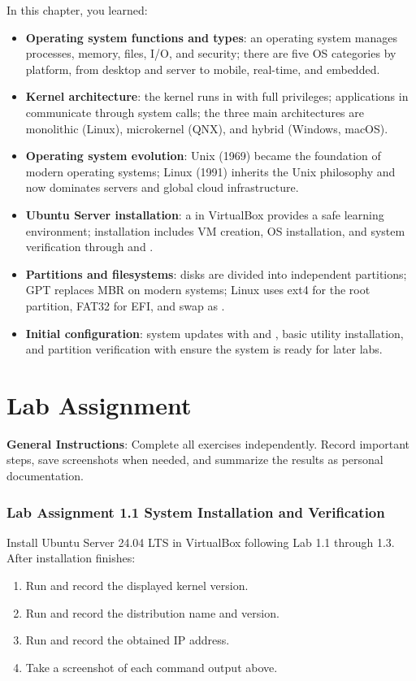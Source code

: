 In this chapter, you learned:

\begin{itemize}[noitemsep,topsep=2pt]
    \item \textbf{Operating system functions and types}: an operating system manages processes, memory, files, I/O, and security; there are five OS categories by platform, from desktop and server to mobile, real-time, and embedded.
    \item \textbf{Kernel architecture}: the kernel runs in  with full privileges; applications in  communicate through system calls; the three main architectures are monolithic (Linux), microkernel (QNX), and hybrid (Windows, macOS).
    \item \textbf{Operating system evolution}: Unix (1969) became the foundation of modern operating systems; Linux (1991) inherits the Unix philosophy and now dominates servers and global cloud infrastructure.
    \item \textbf{Ubuntu Server installation}: a  in VirtualBox provides a safe learning environment; installation includes VM creation, OS installation, and system verification through  and .
    \item \textbf{Partitions and filesystems}: disks are divided into independent partitions; GPT replaces MBR on modern systems; Linux uses ext4 for the root partition, FAT32 for EFI, and swap as .
    \item \textbf{Initial configuration}: system updates with  and , basic utility installation, and partition verification with  ensure the system is ready for later labs.
\end{itemize}

\section{Lab Assignment}
\label{sec:tugas}

\textbf{General Instructions}: Complete all exercises independently. Record important steps, save screenshots when needed, and summarize the results as personal documentation.

\subsubsection*{Lab Assignment 1.1 System Installation and Verification}
Install Ubuntu Server 24.04 LTS in VirtualBox following Lab 1.1 through 1.3. After installation finishes:
\begin{enumerate}
    \item Run  and record the displayed kernel version.
    \item Run  and record the distribution name and version.
    \item Run  and record the obtained IP address.
    \item Take a screenshot of each command output above.
\end{enumerate}


